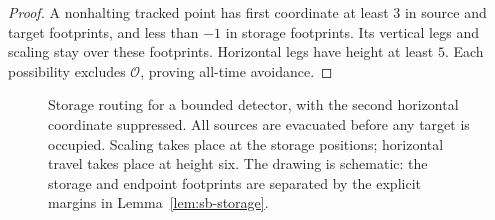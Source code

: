 \begin{proof}
A nonhalting tracked point has first coordinate at least $3$ in source and target footprints, and less than $-1$ in storage footprints.  Its vertical legs and scaling stay over these footprints.  Horizontal legs have height at least $5$.  Each possibility excludes $\mathcal O$, proving all-time avoidance.
\end{proof}


\begin{figure}[ht]
\centering
{}
\caption{Storage routing for a bounded detector, with the second
horizontal coordinate suppressed. All sources are evacuated before
any target is occupied. Scaling takes place at the storage positions;
horizontal travel takes place at height six. The drawing is schematic:
the storage and endpoint footprints are separated by the explicit
margins in Lemma~\ref{lem:sb-storage}.}
\label{fig:sb-storage}
\end{figure}

